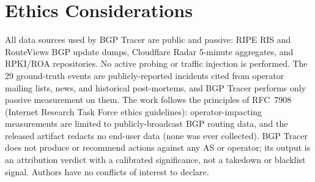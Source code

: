 \documentclass[sigconf,review,nonatbib]{acmart}
\begin{document}



\section*{Ethics Considerations}
All data sources used by BGP Tracer are public and passive: RIPE RIS
and RouteViews BGP update dumps, Cloudflare Radar 5-minute
aggregates, and RPKI/ROA repositories. No active probing or
traffic injection is performed. The 29 ground-truth events are
publicly-reported incidents cited from operator mailing lists,
news, and historical post-mortems, and BGP Tracer performs only
passive measurement on them. The work follows the principles of
RFC~7908 (Internet Research Task Force ethics guidelines):
operator-impacting measurements are limited to publicly-broadcast
BGP routing data, and the released artifact redacts no end-user
data (none was ever collected). BGP Tracer does not produce or
recommend actions against any AS or operator; its output is an
attribution verdict with a calibrated significance, not a takedown
or blacklist signal. Authors have no conflicts of interest to
declare.
\end{document}

